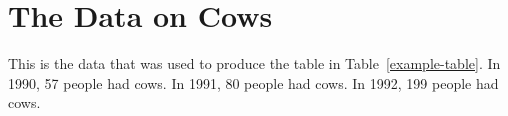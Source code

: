 \chapter{The Data on Cows}
\label{data.app}

This is the data that was used to produce the table in
Table~\ref{example-table}. In 1990, 57 people had cows. In 1991, 80
people had cows. In 1992, 199 people had cows.
